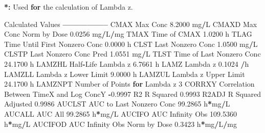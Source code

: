 \documentclass[12pt,]{krantz}
\newenvironment{Shaded}{\begin{snugshade}}{\end{snugshade}}
\newcommand{\DecValTok}[1]{\textcolor[rgb]{0.00,0.00,0.81}{#1}}
\newcommand{\FloatTok}[1]{\textcolor[rgb]{0.00,0.00,0.81}{#1}}
\newcommand{\StringTok}[1]{\textcolor[rgb]{0.31,0.60,0.02}{#1}}
\newcommand{\ControlFlowTok}[1]{\textcolor[rgb]{0.13,0.29,0.53}{\textbf{#1}}}
\newcommand{\OperatorTok}[1]{\textcolor[rgb]{0.81,0.36,0.00}{\textbf{#1}}}
\newcommand{\ErrorTok}[1]{\textcolor[rgb]{0.64,0.00,0.00}{\textbf{#1}}}
\newcommand{\NormalTok}[1]{#1}
\theoremstyle{definition}
\theoremstyle{definition}
\theoremstyle{definition}
\theoremstyle{remark}
\begin{document}
\begin{Shaded}
\begin{Highlighting}[]
{{{{{{{{{{{{{{{{\OperatorTok{*}\ErrorTok{:}\StringTok{ }\NormalTok{Used }\ControlFlowTok{for}\NormalTok{ the calculation of Lambda z.}


\NormalTok{Calculated Values}
\OperatorTok{-----------------}
\NormalTok{CMAX       Max Conc                                        }\FloatTok{8.2000}\NormalTok{ mg}\OperatorTok{/}\NormalTok{L}
\NormalTok{CMAXD      Max Conc Norm by Dose                           }\FloatTok{0.0256}\NormalTok{ mg}\OperatorTok{/}\NormalTok{L}\OperatorTok{/}\NormalTok{mg}
\NormalTok{TMAX       Time of CMAX                                    }\FloatTok{1.0200}\NormalTok{ h}
\NormalTok{TLAG       Time Until First Nonzero Conc                   }\FloatTok{0.0000}\NormalTok{ h}
\NormalTok{CLST       Last Nonzero Conc                               }\FloatTok{1.0500}\NormalTok{ mg}\OperatorTok{/}\NormalTok{L}
\NormalTok{CLSTP      Last Nonzero Conc Pred                          }\FloatTok{1.0551}\NormalTok{ mg}\OperatorTok{/}\NormalTok{L}
\NormalTok{TLST       Time of Last Nonzero Conc                      }\FloatTok{24.1700}\NormalTok{ h}
\NormalTok{LAMZHL     Half}\OperatorTok{-}\NormalTok{Life Lambda z                              }\FloatTok{6.7661}\NormalTok{ h}
\NormalTok{LAMZ       Lambda z                                        }\FloatTok{0.1024} \OperatorTok{/}\NormalTok{h}
\NormalTok{LAMZLL     Lambda z Lower Limit                            }\FloatTok{9.0000}\NormalTok{ h}
\NormalTok{LAMZUL     Lambda z Upper Limit                           }\FloatTok{24.1700}\NormalTok{ h}
\NormalTok{LAMZNPT    Number of Points }\ControlFlowTok{for}\NormalTok{ Lambda z                   }\DecValTok{3}
\NormalTok{CORRXY     Correlation Between TimeX and Log ConcY        }\OperatorTok{-}\FloatTok{0.9997} 
\NormalTok{R2         R Squared                                       }\FloatTok{0.9993} 
\NormalTok{R2ADJ      R Squared Adjusted                              }\FloatTok{0.9986} 
\NormalTok{AUCLST     AUC to Last Nonzero Conc                       }\FloatTok{99.2865}\NormalTok{ h}\OperatorTok{*}\NormalTok{mg}\OperatorTok{/}\NormalTok{L}
\NormalTok{AUCALL     AUC All                                        }\FloatTok{99.2865}\NormalTok{ h}\OperatorTok{*}\NormalTok{mg}\OperatorTok{/}\NormalTok{L}
\NormalTok{AUCIFO     AUC Infinity Obs                              }\FloatTok{109.5360}\NormalTok{ h}\OperatorTok{*}\NormalTok{mg}\OperatorTok{/}\NormalTok{L}
\NormalTok{AUCIFOD    AUC Infinity Obs Norm by Dose                   }\FloatTok{0.3423}\NormalTok{ h}\OperatorTok{*}\NormalTok{mg}\OperatorTok{/}\NormalTok{L}\OperatorTok{/}\NormalTok{mg}
}}}}}}}}}}}}}}}}
\end{Highlighting}
\end{Shaded}
\end{document}
